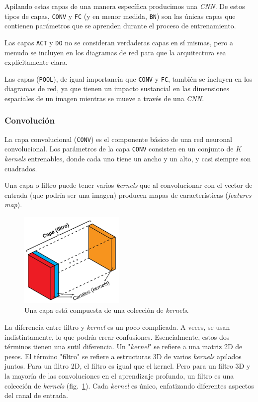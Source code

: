 \documentclass[a4paper,12pt]{article}
\begin{document}
Apilando estas capas de una manera específica producimos una \textit{CNN}. De estos tipos de capas, \texttt{CONV} y \texttt{FC} (y en menor medida, \texttt{BN}) son las únicas capas que contienen parámetros que se aprenden durante el proceso de entrenamiento.

Las capas \texttt{ACT} y \texttt{DO} no se consideran verdaderas capas en sí mismas, pero a menudo se incluyen en los diagramas de red para que la arquitectura sea explícitamente clara.

Las capas (\texttt{POOL}), de igual importancia que \texttt{CONV} y \texttt{FC}, también se incluyen en los diagramas de red, ya que tienen un impacto sustancial en las dimensiones espaciales de un
imagen mientras se mueve a través de una \textit{CNN}.

\subsubsection{Convolución}

La capa convolucional (\texttt{CONV}) es el componente básico de una red neuronal convolucional. Los parámetros de la capa \texttt{CONV} consisten en un conjunto de $K$ \textit{kernels} entrenables, donde cada uno tiene un ancho y un alto, y casi siempre son cuadrados. 

Una capa o filtro puede tener varios \textit{kernels} que al convolucionar con el vector de entrada (que podría ser una imagen) producen mapas de características (\textit{features map}).

\begin{figure}[H]
	\begin{center}				
	\includegraphics[width=0.45\textwidth]{layer-kernels.png}
  	\caption{Una capa está compuesta de una colección de \textit{kernels}.}
  	\label{fig:layer-kernel}
  	\end{center}
\end{figure}

La diferencia entre filtro y \textit{kernel} es un poco complicada. A veces, se usan indistintamente, lo que podría crear confusiones. Esencialmente, estos dos términos tienen una sutil diferencia. Un "\textit{kernel}" se refiere a una matriz 2D de pesos. El término "filtro" se refiere a estructuras 3D de varios \textit{kernels} apilados juntos. Para un filtro 2D, el filtro es igual que el kernel. Pero para un filtro 3D y la mayoría de las convoluciones en el aprendizaje profundo, un filtro es una colección de \textit{kernels} (fig.~\ref{fig:layer-kernel}). Cada \textit{kernel} es único, enfatizando diferentes aspectos del canal de entrada.
\end{document}
